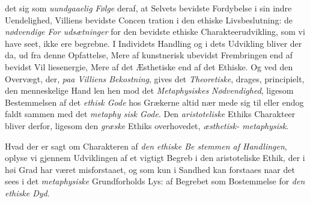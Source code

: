 det sig som \emph{uundgaaelig Følge} deraf, at Selvets bevidste
Fordybelse i sin indre Uendelighed, Villiens bevidste Concen\-%
tration i den ethiske Livsbeslutning: de \emph{nødvendige For\-%
udsætninger} for den bevidste ethiske Charakteerudvikling,
som vi have seet, ikke ere begrebne. I Individets Handling
og i dets Udvikling bliver der da, ud fra denne Opfattelse,
Mere af kunstnerisk ubevidst Frembringen end af bevidst Vil\-%
liesenergie, Mere af det Æsthetiske end af det Ethiske. Og
ved den Overvægt, der, \emph{paa Villiens Bekostning}, gives
det \emph{Theoretiske}, drages, principielt, den menneskelige Hand\-%
len hen mod det \emph{Metaphysiskes Nødvendighed}, ligesom
Bestemmelsen af det \emph{ethisk Gode} hos Grækerne altid nær\-%
mede sig til eller endog faldt sammen med det \emph{metaphy\-%
sisk Gode}. Den \emph{aristoteliske} Ethiks Charakteer bliver
derfor, ligesom den \emph{græske} Ethiks overhovedet, \emph{æsthetisk-%
metaphysisk}.

Hvad der er sagt om Charakteren af \emph{den ethiske Be\-%
stemmen af Handlingen}, oplyse vi gjennem Udviklingen
af et vigtigt Begreb i den aristoteliske Ethik, der i høi Grad
har været misforstaaet, og som kun i Sandhed kan forstaaes
naar det sees i det \emph{metaphysiske} Grundforholds Lys: af
Begrebet  som Bostemmelse for \emph{den ethiske Dyd}.

